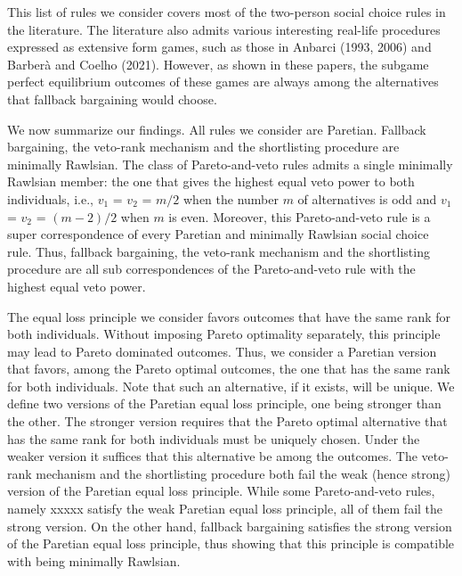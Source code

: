 \documentclass[version=3.21, pagesize, twoside=off, bibliography=totoc, DIV=calc, fontsize=12pt, a4paper]{scrartcl}
\begin{document}
This list of rules we consider covers most of the two-person social choice rules in the literature. The literature also admits various interesting real-life procedures expressed as extensive form games, such as those in Anbarci (1993, 2006) and Barberà and Coelho (2021). However, as shown in these papers, the subgame perfect equilibrium outcomes of these games are always among the alternatives that fallback bargaining would choose. 

We now summarize our findings. All rules we consider are Paretian. Fallback bargaining, the veto-rank mechanism and the shortlisting procedure are minimally Rawlsian. The class of Pareto-and-veto rules admits a single minimally Rawlsian member: the one that gives the highest equal veto power to both individuals, i.e., $v_1$ = $v_2$ = $m/2$ when the number $m$ of alternatives is odd and $v_1$ = $v_2$ = $(m-2)/2$ when $m$ is even. Moreover, this Pareto-and-veto rule is a super correspondence of every Paretian and minimally Rawlsian social choice rule. Thus, fallback bargaining, the veto-rank mechanism and the shortlisting procedure are all sub correspondences of the Pareto-and-veto rule with the highest equal veto power.

The equal loss principle we consider favors outcomes that have the same rank for both individuals. Without imposing Pareto optimality separately, this principle may lead to Pareto dominated outcomes. Thus, we consider a Paretian version that favors, among the Pareto optimal outcomes, the one that has the same rank for both individuals. Note that such an alternative, if it exists, will be unique. We define two versions of the Paretian equal loss principle, one being stronger than the other. The stronger version requires that the Pareto optimal alternative that has the same rank for both individuals must be uniquely chosen. Under the weaker version it suffices that this alternative be among the outcomes. The veto-rank mechanism and the shortlisting procedure both fail the weak (hence strong) version of the Paretian equal loss principle.  While some Pareto-and-veto rules, namely xxxxx satisfy the weak Paretian equal loss principle, all of them fail the strong version. On the other hand, fallback bargaining satisfies the strong version of the Paretian equal loss principle, thus showing that this principle is compatible with being minimally Rawlsian. 
\end{document}
